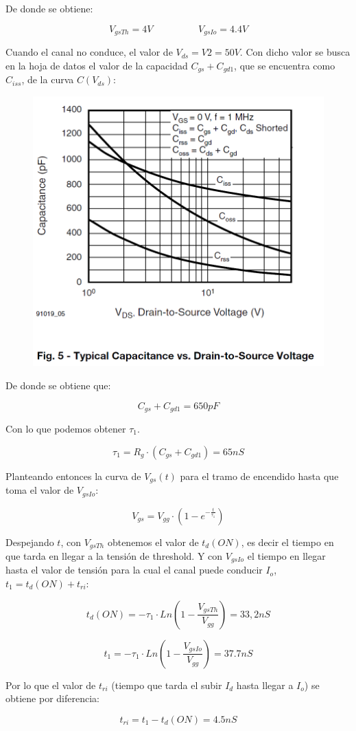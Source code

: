 \documentclass[e4_tp1_main.tex]{subfiles}
\begin{document}
De donde se obtiene:

\[
V_{gsTh} = 4V \hspace{2cm} V_{gsIo} = 4.4V
\]

Cuando el canal no conduce, el valor de $V_{ds} = V2 = 50V$. Con dicho valor se busca en la hoja de datos el valor de la capacidad $C_{gs} + C_{gd1}$, que se encuentra como $C_{iss}$, de la curva $C(V_{ds})$:

\begin{figure}[H]
\centering
\includegraphics[width=0.5\linewidth]{Imagenes/Punto1/Ej1-Capacidades.png}
\end{figure}

De donde se obtiene que:

\[
C_{gs} + C_{gd1} = 650pF
\]

Con lo que podemos obtener $\tau_1$.

\[
\tau_1 = R_g \cdot (C_{gs} + C_{gd1}) = 65nS
\]

Planteando entonces la curva de $V_{gs}(t)$ para el tramo de encendido hasta que toma el valor de $V_{gsIo}$:

\[
V_{gs} = V_{gg} \cdot (1 - e^{-\frac{t}{\tau_1}})
\]

Despejando $t$, con $V_{gsTh}$ obtenemos el valor de $t_d(ON)$, es decir el tiempo en que tarda en llegar a la tensión de threshold. Y con $V_{gsIo}$ el tiempo en llegar hasta el valor de tensión para la cual el canal puede conducir $I_o$, $t_1 = t_d(ON) + t_{ri}$:

\[
t_d(ON) = -\tau_1 \cdot Ln\left( 1 - \frac{V_{gsTh}}{V_{gg}} \right) = 33,2nS
\]

\[
t_1 = -\tau_1 \cdot Ln\left( 1 - \frac{V_{gsIo}}{V_{gg}} \right) = 37.7nS
\]

Por lo que el valor de $t_{ri}$ (tiempo que tarda el subir $I_d$ hasta llegar a $I_o$) se obtiene por diferencia:

\[
t_{ri} = t_1 - t_d(ON)= 4.5nS
\]
\end{document}
